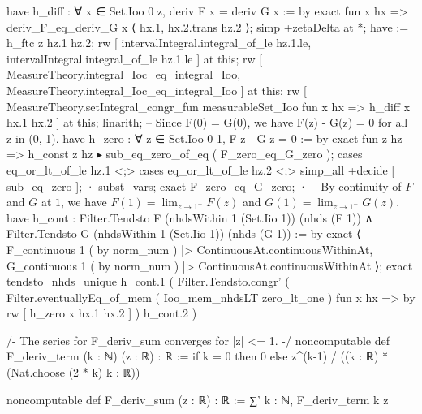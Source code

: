     have h_diff : ∀ x ∈ Set.Ioo 0 z, deriv F x = deriv G x := by
      exact fun x hx => deriv_F_eq_deriv_G x ⟨ hx.1, hx.2.trans hz.2 ⟩;
    simp +zetaDelta at *;
    have := h_ftc z hz.1 hz.2; rw [ intervalIntegral.integral_of_le hz.1.le, intervalIntegral.integral_of_le hz.1.le ] at this; rw [ MeasureTheory.integral_Ioc_eq_integral_Ioo, MeasureTheory.integral_Ioc_eq_integral_Ioo ] at this; rw [ MeasureTheory.setIntegral_congr_fun measurableSet_Ioo fun x hx => h_diff x hx.1 hx.2 ] at this; linarith;
  -- Since F(0) = G(0), we have F(z) - G(z) = 0 for all z in (0, 1).
  have h_zero : ∀ z ∈ Set.Ioo 0 1, F z - G z = 0 := by
    exact fun z hz => h_const z hz ▸ sub_eq_zero_of_eq ( F_zero_eq_G_zero );
  cases eq_or_lt_of_le hz.1 <;> cases eq_or_lt_of_le hz.2 <;> simp_all +decide [ sub_eq_zero ];
  · subst_vars; exact F_zero_eq_G_zero;
  · -- By continuity of $F$ and $G$ at $1$, we have $F(1) = \lim_{z \to 1^-} F(z)$ and $G(1) = \lim_{z \to 1^-} G(z)$.
    have h_cont : Filter.Tendsto F (nhdsWithin 1 (Set.Iio 1)) (nhds (F 1)) ∧ Filter.Tendsto G (nhdsWithin 1 (Set.Iio 1)) (nhds (G 1)) := by
      exact ⟨ F_continuous 1 ( by norm_num ) |> ContinuousAt.continuousWithinAt, G_continuous 1 ( by norm_num ) |> ContinuousAt.continuousWithinAt ⟩;
    exact tendsto_nhds_unique h_cont.1 ( Filter.Tendsto.congr' ( Filter.eventuallyEq_of_mem ( Ioo_mem_nhdsLT zero_lt_one ) fun x hx => by rw [ h_zero x hx.1 hx.2 ] ) h_cont.2 )

/-
The series for F_deriv_sum converges for |z| <= 1.
-/
noncomputable def F_deriv_term (k : ℕ) (z : ℝ) : ℝ := if k = 0 then 0 else z^(k-1) / ((k : ℝ) * (Nat.choose (2 * k) k : ℝ))

noncomputable def F_deriv_sum (z : ℝ) : ℝ := ∑' k : ℕ, F_deriv_term k z

